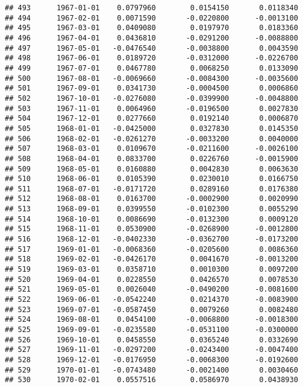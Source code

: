 \documentclass[
]{article}
\begin{document}
\begin{verbatim}
## 493      1967-01-01    0.0797960        0.0154150       0.0118340
## 494      1967-02-01    0.0071590       -0.0220800      -0.0013100
## 495      1967-03-01    0.0409080        0.0197970       0.0183360
## 496      1967-04-01    0.0436810       -0.0291200      -0.0088800
## 497      1967-05-01   -0.0476540       -0.0038800       0.0043590
## 498      1967-06-01    0.0189720       -0.0312000      -0.0226700
## 499      1967-07-01    0.0467780        0.0068250       0.0133090
## 500      1967-08-01   -0.0069660       -0.0084300      -0.0035600
## 501      1967-09-01    0.0341730       -0.0004500       0.0006860
## 502      1967-10-01   -0.0276080       -0.0399900      -0.0048800
## 503      1967-11-01    0.0064960       -0.0196500       0.0027830
## 504      1967-12-01    0.0277660        0.0192140       0.0006870
## 505      1968-01-01   -0.0425000        0.0327830       0.0145350
## 506      1968-02-01   -0.0261270       -0.0033200       0.0040000
## 507      1968-03-01    0.0109670       -0.0211600      -0.0026100
## 508      1968-04-01    0.0833700        0.0226760      -0.0015900
## 509      1968-05-01    0.0160880        0.0042830       0.0063630
## 510      1968-06-01    0.0105390        0.0230010       0.0166750
## 511      1968-07-01   -0.0171720        0.0289160       0.0176380
## 512      1968-08-01    0.0163700       -0.0002900       0.0020990
## 513      1968-09-01    0.0399550       -0.0102300       0.0055290
## 514      1968-10-01    0.0086690       -0.0132300       0.0009120
## 515      1968-11-01    0.0530900       -0.0268900      -0.0012800
## 516      1968-12-01   -0.0402330       -0.0362700      -0.0173200
## 517      1969-01-01   -0.0068360       -0.0205600       0.0086360
## 518      1969-02-01   -0.0426170        0.0041670      -0.0013200
## 519      1969-03-01    0.0358710        0.0010300       0.0097200
## 520      1969-04-01    0.0228550        0.0426570       0.0078530
## 521      1969-05-01    0.0026040       -0.0490200      -0.0081600
## 522      1969-06-01   -0.0542240        0.0214370      -0.0083900
## 523      1969-07-01   -0.0587450        0.0079260       0.0082480
## 524      1969-08-01    0.0454100       -0.0068800      -0.0018300
## 525      1969-09-01   -0.0235580       -0.0531100      -0.0300000
## 526      1969-10-01    0.0458550        0.0365240       0.0332690
## 527      1969-11-01   -0.0297200       -0.0243400      -0.0047400
## 528      1969-12-01   -0.0176950       -0.0068300      -0.0192600
## 529      1970-01-01   -0.0743480       -0.0021400       0.0030460
## 530      1970-02-01    0.0557516        0.0586970       0.0438930

\end{verbatim}
\end{document}
